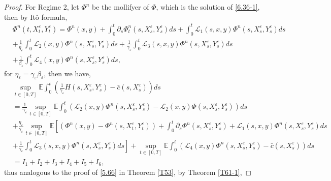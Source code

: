 \documentclass[11pt,reqno]{amsart}
\numberwithin{equation}{section}
\begin{document}
\begin{proof}
For Regime 2, let $\Phi^{n}$ be the mollifyer of $\Phi$, which is the solution of \eqref{6.36-1}, then by It\^{o} formula,
\begin{equation}\label{6.42}
	\begin{split}
		&\Phi^{n}(t,X_{t}^{\varepsilon},Y_{t}^{\varepsilon})
		=\Phi^{n}(x,y)+\int_{0}^{t}\partial_{s}\Phi_{t}^{n}(s,X_{s}^{\varepsilon},Y_{s}^{\varepsilon})ds+\int_{0}^{t}\mathcal{L}_{1}(s,x,y)\Phi^{n}(s,X_{s}^{\varepsilon},Y_{s}^{\varepsilon})ds\\
		&+\frac{1}{\eta_{\varepsilon}}\int_{0}^{t}\mathcal{L}_{2}(x,y)\Phi^{n}(s,X_{s}^{\varepsilon},Y_{s}^{\varepsilon})ds+\frac{1}{\gamma_{\varepsilon}}\int_{0}^{t}\mathcal{L}_{3}(s,x,y)\Phi^{n}(s,X_{s}^{\varepsilon},Y_{s}^{\varepsilon})ds\\
		&+\frac{1}{\beta_{\varepsilon}}\int_{0}^{t}\mathcal{L}_{4}(x,y)\Phi^{n}(s,X_{s}^{\varepsilon},Y_{s}^{\varepsilon})ds,
	\end{split}
\end{equation}
for $ \eta_{\varepsilon}=\gamma_{\varepsilon}\beta_{\varepsilon}$, then we have,
\begin{equation}\label{6.43}
	\begin{split}
	&	\sup_{t\in [0,T]}\mathbb{E}\int_{0}^{t}(\frac{1}{\gamma_{\varepsilon}} H(s,X_{s}^{\varepsilon},Y_{s}^{\varepsilon})- \bar{c}(s,X_{s}^{\varepsilon}))ds\\
		&=\frac{1}{\gamma_{\varepsilon}}	\sup_{t\in [0,T]}\mathbb{E}\int_{0}^{t}\left( \mathcal{L}_{2}(x,y)\Phi^{n}(s,X_{s}^{\varepsilon},Y_{s}^{\varepsilon})-\mathcal{L}_{2}(x,y)\Phi(s,X_{s}^{\varepsilon},Y_{s}^{\varepsilon})\right) ds\\
		&+\frac{\eta_{\varepsilon}}{{\gamma_{\varepsilon}}}	\sup_{t\in [0,T]}\mathbb{E}\left[\left(  \Phi^{n}(x,y)-\Phi^{n}(s,X_{t}^{\varepsilon},Y_{t}^{\varepsilon})\right) +\int_{0}^{t}\partial_{s}\Phi^{n}(s,X_{s}^{\varepsilon},Y_{s}^{\varepsilon})+\mathcal{L}_{1}(s,x,y)\Phi^{n}(s,X_{s}^{\varepsilon},Y_{s}^{\varepsilon})ds\right.	\\
		&\left. +\frac{1}{\gamma_{\varepsilon}}\int_{0}^{t}\mathcal{L}_{3}(s,x,y)\Phi^{n}(s,X_{s}^{\varepsilon},Y_{s}^{\varepsilon})ds\right]+\sup_{t\in [0,T]}\mathbb{E}\int_{0}^{t}(\mathcal{L}_{4}(x,y)\Phi^{n}(s,X_{s}^{\varepsilon},Y_{s}^{\varepsilon})- \bar{c}(s,X_{s}^{\varepsilon}))ds\\
		&=I_{1}+I_{2}+I_{3}+I_{4}+I_{5}+I_{6},
	\end{split}
\end{equation}
thus analogous to the proof of \eqref{5.66} in Theorem \ref{T53}, by Theorem \ref{T61-1},

\end{proof}
\end{document}
